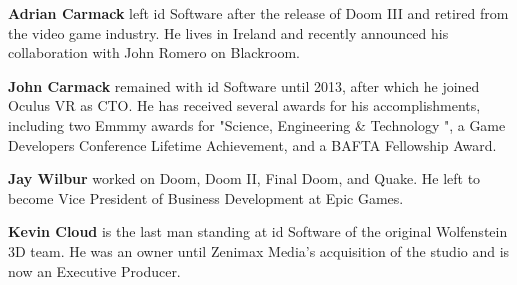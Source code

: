 \textbf{Adrian Carmack} left id Software after the release of Doom III and retired from the video game industry. He lives in Ireland and recently announced his collaboration with John Romero on Blackroom.\\
\par

\textbf{John Carmack} remained with id Software until 2013, after which he joined Oculus VR as CTO. He has received several awards for his accomplishments, including two Emmmy awards for "Science, Engineering \& Technology ", a Game Developers Conference Lifetime Achievement, and a BAFTA Fellowship Award.\\
\par
\textbf{Jay Wilbur} worked on Doom, Doom II, Final Doom, and Quake. He left to become Vice President of Business Development at Epic Games.\\
\par
\textbf{Kevin Cloud} is the last man standing at id Software of the original Wolfenstein 3D team. He was an owner until Zenimax Media's acquisition of the studio and is now an Executive Producer.
\par